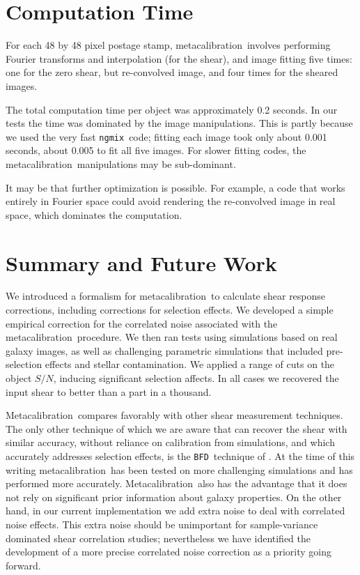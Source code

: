 \documentclass[iop]{emulateapj}
\newcommand{\snr}{$S/N$}
\newcommand{\mcal}{metacalibration}
\newcommand{\Mcal}{Metacalibration}
\newcommand{\ngmix}{\texttt{ngmix}}
\newcommand{\bfd}{\texttt{BFD}}
\begin{document}
\section{Computation Time}

For each 48 by 48 pixel postage stamp, \mcal\ involves performing Fourier
transforms and interpolation (for the shear), and image fitting five times: one
for the zero shear, but re-convolved image, and four times for the sheared
images.

The total computation time per object was approximately 0.2 seconds.  In our
tests the time was dominated by the image manipulations.  This is partly
because we used the very fast \ngmix\ code; fitting each image took only about
0.001 seconds, about 0.005 to fit all five images.  For slower fitting codes,
the \mcal\ manipulations may be sub-dominant.

It may be that further optimization is possible.  For example, a code that
works entirely in Fourier space could avoid rendering the re-convolved image in
real space, which dominates the computation.

\section{Summary and Future Work} \label{sec:summary}

We introduced a formalism for \mcal\ to calculate shear response corrections,
including corrections for selection effects. We developed a simple empirical
correction for the correlated noise associated with the \mcal\ procedure.  We
then ran tests using simulations based on real galaxy images, as well as
challenging parametric simulations that included pre-selection effects and
stellar contamination.  We applied a range of cuts on the object \snr, inducing
significant selection affects.  In all cases we recovered the input shear to
better than a part in a thousand.

\Mcal\ compares favorably with other shear measurement techniques.  The only
other technique of which we are aware that can recover the shear with similar
accuracy, without reliance on calibration from simulations, and which
accurately addresses selection effects, is the \bfd\ technique of
\cite{bfd2016}.  At the time of this writing \mcal\ has been tested on more
challenging simulations and has performed more accurately.  \Mcal\ also has the
advantage that it does not rely on significant prior information about galaxy
properties.  On the other hand, in our current implementation we add extra
noise to deal with correlated noise effects.  This extra noise should be
unimportant for sample-variance dominated shear correlation studies;
nevertheless we have identified the development of a more precise correlated
noise correction as a priority going forward.
\end{document}
